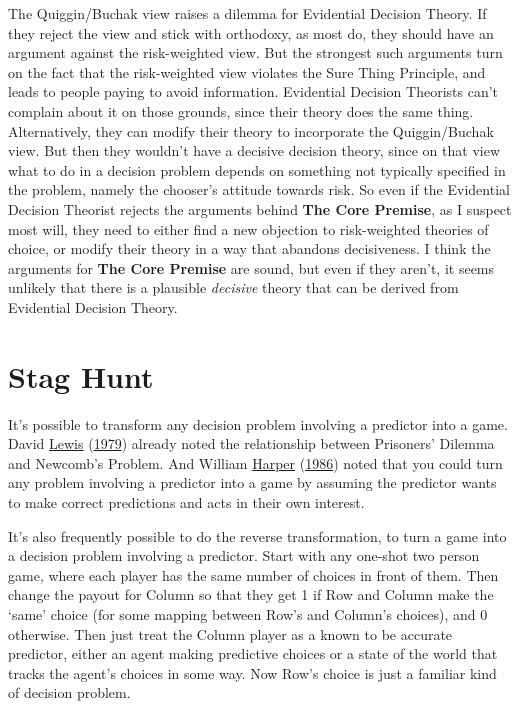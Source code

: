 \documentclass[
  12pt,
]{article}
\begin{document}
The Quiggin/Buchak view raises a dilemma for Evidential Decision Theory.
If they reject the view and stick with orthodoxy, as most do, they
should have an argument against the risk-weighted view. But the
strongest such arguments turn on the fact that the risk-weighted view
violates the Sure Thing Principle, and leads to people paying to avoid
information. Evidential Decision Theorists can't complain about it on
those grounds, since their theory does the same thing. Alternatively,
they can modify their theory to incorporate the Quiggin/Buchak view. But
then they wouldn't have a decisive decision theory, since on that view
what to do in a decision problem depends on something not typically
specified in the problem, namely the chooser's attitude towards risk. So
even if the Evidential Decision Theorist rejects the arguments behind
\textbf{The Core Premise}, as I suspect most will, they need to either
find a new objection to risk-weighted theories of choice, or modify
their theory in a way that abandons decisiveness. I think the arguments
for \textbf{The Core Premise} are sound, but even if they aren't, it
seems unlikely that there is a plausible \emph{decisive} theory that can
be derived from Evidential Decision Theory.

\hypertarget{stag-hunt}{%
\section{Stag Hunt}\label{stag-hunt}}

It's possible to transform any decision problem involving a predictor
into a game. David \protect\hyperlink{ref-Lewis1979e}{Lewis}
(\protect\hyperlink{ref-Lewis1979e}{1979}) already noted the
relationship between Prisoners' Dilemma and Newcomb's Problem. And
William \protect\hyperlink{ref-Harper1986}{Harper}
(\protect\hyperlink{ref-Harper1986}{1986}) noted that you could turn any
problem involving a predictor into a game by assuming the predictor
wants to make correct predictions and acts in their own interest.

It's also frequently possible to do the reverse transformation, to turn
a game into a decision problem involving a predictor. Start with any
one-shot two person game, where each player has the same number of
choices in front of them. Then change the payout for Column so that they
get 1 if Row and Column make the `same' choice (for some mapping between
Row's and Column's choices), and 0 otherwise. Then just treat the Column
player as a known to be accurate predictor, either an agent making
predictive choices or a state of the world that tracks the agent's
choices in some way. Now Row's choice is just a familiar kind of
decision problem.
\end{document}
